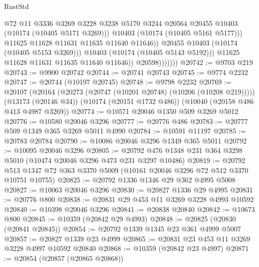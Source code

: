 \begin{lexlean}{RustStd}
\begin{coremodule}
                                  @72
                                  @11
                                  @3336
                                  @3269
                                  @3228
                                  @3238
                                  @5170
                                  @3244
                                  @20564
                                  @20455
                                  @10403
                                  (@10174 (@10405 @5171 @3269)))
                                @10403
                                (@10174 (@10405 @5161 @5177)))
                              @11625
                              @11628
                              @11631
                              @11635
                              @11640
                              @11646))
                          @20455
                          @10403
                          (@10174 (@10405 @5153 @3269)))
                        @10403
                        (@10174 (@10405 @5143 @5192)))
                      @11625
                      @11628
                      @11631
                      @11635
                      @11640
                      @11646))
                  @20598)))))))
@20742 := @9703 @219
@20743 := @9900 @20742
@20744 := @20741 @20743
@20745 := @9774 @2232
@20747 := @20744 (@10197 @20745)
@20748 := @9798 @2232
@20769 := @20107
    (@20164 (@20273 (@20747 (@10201 @20748) (@10206 (@10208 @219)))))
    (@13173 (@20146 @34))
    (@10174 (@20151 @1732 @486))
    (@10040 (@20158 @486 @413 @4987 @3269))
@20774 := @10571 @20046 @1350 @509 @3269 @5012
@20776 := @10580 @20046 @3296
@20777 := @20776 @486
@20783 := @20777 @509 @1349 @365 @3269 @5011 @4990
@20784 := @10591 @11197
@20785 := @20783 @20784
@20790 := @10086 @20046 @3296 @1349 @365 @5011
@20792 := @10095 @20046 @3296
@20805 := @20792 @476 @1348 @231 @364 @3298 @5010 (@10474 @20046 @3296 @473 @231 @3297 @10486)
@20819 := @20792 @513 @1347 @72 @363 @3370 @5009 (@10161 @20046 @3296 @72 @512 @3370 @10751 @10755)
@20825 := @20792 @1336 @1346 @29 @362 @4995 @5008
@20827 := @10063 @20046 @3296
@20830 := @20827 @1336 @29 @4995
@20831 := @20776 @800
@20838 := @20831 @29 @453 @11 @3269 @3228 @4993 @10592
@20840 := @10398 @20046 @3296
@20841 := @20838 @20840
@20842 := @10673 @800
@20845 := @10359 (@20842 @29 @4993)
@20848 := @20825 (@20830 (@20841 @20845))
@20854 := @20792 @1339 @1345 @23 @361 @4999 @5007
@20857 := @20827 @1339 @23 @4999
@20865 := @20831 @23 @453 @11 @3269 @3228 @4997 @10592 @20840
@20868 := @10359 (@20842 @23 @4997)
@20871 := @20854 (@20857 (@20865 @20868))

\end{coremodule}
\end{lexlean}
